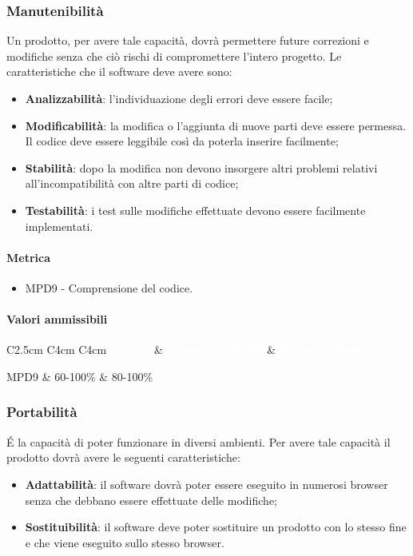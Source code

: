 \subsubsection{Manutenibilità}
Un prodotto, per avere tale capacità, dovrà permettere future correzioni e modifiche senza che ciò rischi di compromettere l'intero progetto. Le caratteristiche che il software deve avere sono:
\begin{itemize}
\item \textbf{Analizzabilità}: l'individuazione degli errori deve essere facile;
\item \textbf{Modificabilità}: la modifica o l'aggiunta di nuove parti deve essere permessa. Il codice deve essere leggibile così da poterla inserire facilmente;
\item \textbf{Stabilità}: dopo la modifica non devono insorgere altri problemi relativi all'incompatibilità con altre parti di codice;
\item \textbf{Testabilità}: i test sulle modifiche effettuate devono essere facilmente implementati.
\end{itemize}
\paragraph{Metrica}
\begin{itemize}
\item MPD9 - Comprensione del codice.
\end{itemize}
\paragraph{Valori ammissibili}
\renewcommand{\arraystretch}{1.5}
\begin{longtable}{C{2.5cm} C{4cm} C{4cm}}
\textcolor{white}{\textbf{Metrica}}&
\textcolor{white}{\textbf{Valore accettabile}}&
\textcolor{white}{\textbf{Valore ottimale}}\\	
\endhead
\endfoot
{}\caption{Metrica di qualità del prodotto riguardo la manutenibilità}
\endlastfoot
		MPD9 &  
		60-100\% &
		80-100\% \\
\end{longtable}
\subsubsection{Portabilità}
\'E la capacità di poter funzionare in diversi ambienti. Per avere tale capacità il prodotto dovrà avere le seguenti caratteristiche:
\begin{itemize}
\item \textbf{Adattabilità}: il software dovrà poter essere eseguito in numerosi browser senza che debbano essere effettuate delle modifiche;
\item \textbf{Sostituibilità}: il software deve poter sostituire un prodotto con lo stesso fine e che viene eseguito sullo stesso browser. 
\end{itemize}
